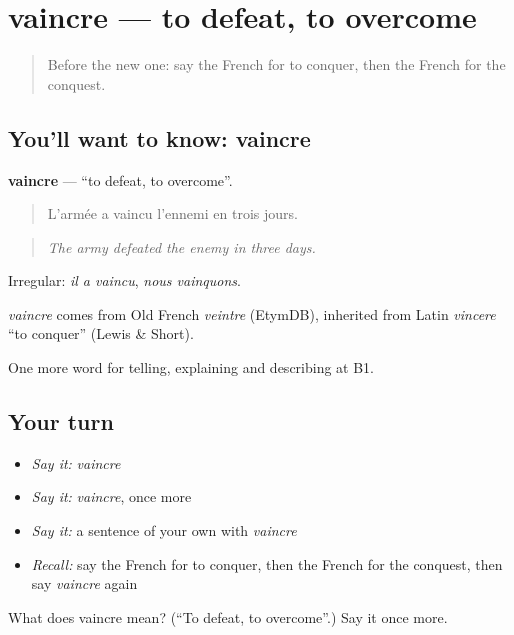 \section[vaincre]{vaincre — to defeat, to overcome}

\label{lesson:FR-C324-vaincre}



\begin{quote}
Before the new one: say the French for to conquer, then the French for the conquest.
\end{quote}

\subsection*{You'll want to know: vaincre}
\textbf{vaincre} — \textquotedblleft{}to defeat, to overcome\textquotedblright{}.

\begin{quote}
L'armée a vaincu l'ennemi en trois jours.
\end{quote}

\begin{quote}
\emph{The army defeated the enemy in three days.}
\end{quote}

Irregular: \emph{il a vaincu}, \emph{nous vainquons}.

\begin{cousinweb}
\emph{vaincre} comes from Old French \emph{veintre} (EtymDB), inherited from Latin \emph{vincere} \textquotedblleft{}to conquer\textquotedblright{} (Lewis \& Short).
\end{cousinweb}

\begin{grammarlens}[title={What you've built}]
One more word for telling, explaining and describing at B1.
\end{grammarlens}

\subsection*{Your turn}
\begin{itemize}
\raggedright
  \item \emph{Say it:} \emph{vaincre}
  \item \emph{Say it:} \emph{vaincre}, once more
  \item \emph{Say it:} a sentence of your own with \emph{vaincre}
  \item \emph{Recall:} say the French for to conquer, then the French for the conquest, then say \emph{vaincre} again
\end{itemize}

\begin{tcolorbox}[breakable,colback=teal!4,colframe=teal!35!black,title={Before you move on}]
What does vaincre mean? (\textquotedblleft{}To defeat, to overcome\textquotedblright{}.) Say it once more.
\end{tcolorbox}
